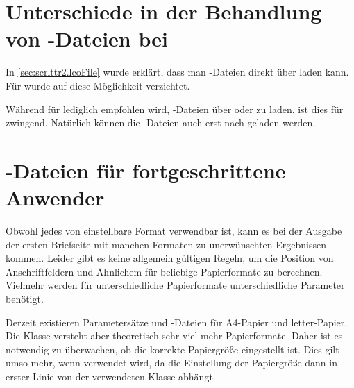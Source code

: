 \section{Unterschiede in der Behandlung von -Dateien bei
  }
\BeginIndexGroup
{}

In \autoref{sec:scrlttr2.lcoFile} wurde
erklärt, dass man -Dateien direkt über  laden
kann. Für  wurde auf diese
Möglichkeit verzichtet.

\begin{Declaration}
\end{Declaration}
Während für  lediglich empfohlen wird, -Dateien über
 oder
 zu laden, ist dies für
 zwingend. Natürlich können die -Dateien auch
erst nach  geladen werden.
%
\EndIndexGroup
%
\EndIndexGroup
%
\fi


\section{-Dateien für fortgeschrittene Anwender}
\BeginIndexGroup
{}

\BeginIndexGroup%
%
Obwohl jedes von \hyperref[cha:typearea]{}%
 einstellbare Format verwendbar ist, kann es bei der
Ausgabe der ersten Briefseite mit manchen Formaten zu unerwünschten
Ergebnissen kommen. Leider gibt es
keine allgemein gültigen Regeln, um die Position von Anschriftfeldern und
Ähnlichem für beliebige Papierformate zu berechnen. Vielmehr werden für
unterschiedliche Papierformate unterschiedliche Parameter benötigt.%


Derzeit existieren Parametersätze und -Dateien für A4-Papier und
letter-Papier. Die Klasse  versteht aber theoretisch sehr viel
mehr Papierformate. Daher ist es notwendig zu überwachen, ob die korrekte
Papiergröße eingestellt ist. Dies gilt umso mehr, wenn 
verwendet wird, da die Einstellung der Papiergröße dann in erster Linie von
der verwendeten Klasse abhängt.

